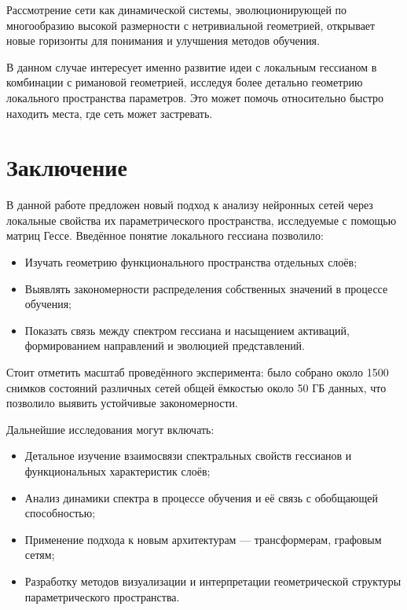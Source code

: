 \documentclass[a4paper,12pt]{article}
\begin{document}
Рассмотрение сети как динамической системы, эволюционирующей по многообразию высокой размерности с
нетривиальной геометрией, открывает новые горизонты для понимания и улучшения методов обучения.

В данном случае интересует именно развитие идеи с локальным гессианом в комбинации с римановой геометрией,
исследуя более детально геометрию локального пространства параметров. Это может помочь относительно быстро
находить места, где сеть может застревать.

\section{Заключение}
В данной работе предложен новый подход к анализу нейронных сетей через локальные свойства их параметрического
пространства, исследуемые с помощью матриц Гессе. Введённое понятие локального гессиана позволило:
\begin{itemize}
  \item Изучать геометрию функционального пространства отдельных слоёв;
  \item Выявлять закономерности распределения собственных значений в процессе обучения;
  \item Показать связь между спектром гессиана и насыщением активаций, формированием направлений и эволюцией
    представлений.
\end{itemize}

Стоит отметить масштаб проведённого эксперимента: было собрано около 1500 снимков состояний различных сетей
общей ёмкостью около 50 ГБ данных, что позволило выявить устойчивые закономерности.

Дальнейшие исследования могут включать:
\begin{itemize}
  \item Детальное изучение взаимосвязи спектральных свойств гессианов и функциональных характеристик слоёв;
  \item Анализ динамики спектра в процессе обучения и её связь с обобщающей способностью;
  \item Применение подхода к новым архитектурам — трансформерам, графовым сетям;
  \item Разработку методов визуализации и интерпретации геометрической структуры параметрического пространства.
\end{itemize}
\end{document}
